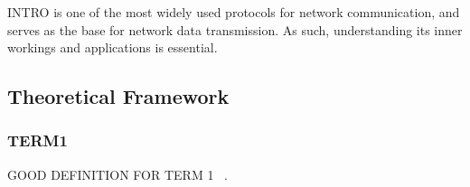 % 
% 
% 
% 
 INTRO is one of the most widely used protocols for network communication, and
serves as the base for network data transmission. As such, understanding its inner workings and
applications is essential.\@



\subsection{Theoretical Framework}

\subsubsection{TERM1}
GOOD DEFINITION FOR TERM 1 ~\cite{kurose:2021}.

%
%

